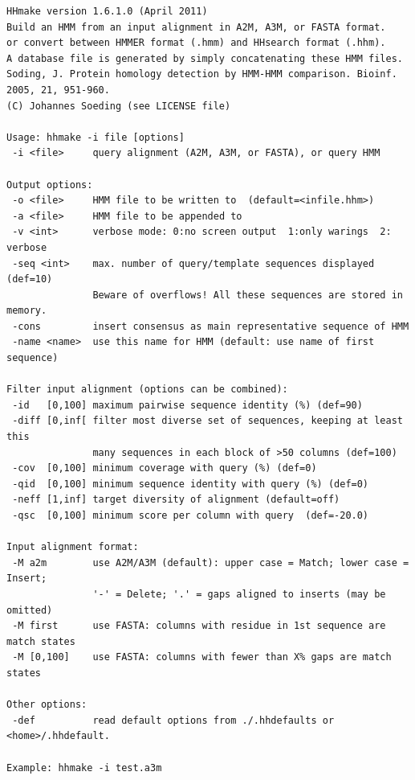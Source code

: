 \documentclass[11pt,a4paper]{article}
\begin{document}
\small \begin{verbatim}
HHmake version 1.6.1.0 (April 2011)
Build an HMM from an input alignment in A2M, A3M, or FASTA format.   
or convert between HMMER format (.hmm) and HHsearch format (.hhm).   
A database file is generated by simply concatenating these HMM files.
Soding, J. Protein homology detection by HMM-HMM comparison. Bioinf. 2005, 21, 951-960.
(C) Johannes Soeding (see LICENSE file)

Usage: hhmake -i file [options]                                       
 -i <file>     query alignment (A2M, A3M, or FASTA), or query HMM         

Output options:                                                           
 -o <file>     HMM file to be written to  (default=<infile.hhm>)          
 -a <file>     HMM file to be appended to                                 
 -v <int>      verbose mode: 0:no screen output  1:only warings  2: verbose
 -seq <int>    max. number of query/template sequences displayed (def=10)  
               Beware of overflows! All these sequences are stored in memory.
 -cons         insert consensus as main representative sequence of HMM 
 -name <name>  use this name for HMM (default: use name of first sequence)   

Filter input alignment (options can be combined):                         
 -id   [0,100] maximum pairwise sequence identity (%) (def=90)   
 -diff [0,inf[ filter most diverse set of sequences, keeping at least this    
               many sequences in each block of >50 columns (def=100)
 -cov  [0,100] minimum coverage with query (%) (def=0) 
 -qid  [0,100] minimum sequence identity with query (%) (def=0) 
 -neff [1,inf] target diversity of alignment (default=off)
 -qsc  [0,100] minimum score per column with query  (def=-20.0)

Input alignment format:                                                    
 -M a2m        use A2M/A3M (default): upper case = Match; lower case = Insert;
               '-' = Delete; '.' = gaps aligned to inserts (may be omitted)   
 -M first      use FASTA: columns with residue in 1st sequence are match states
 -M [0,100]    use FASTA: columns with fewer than X% gaps are match states   

Other options:                                                               
 -def          read default options from ./.hhdefaults or <home>/.hhdefault. 

Example: hhmake -i test.a3m 
\end{verbatim} \normalsize
\end{document}
